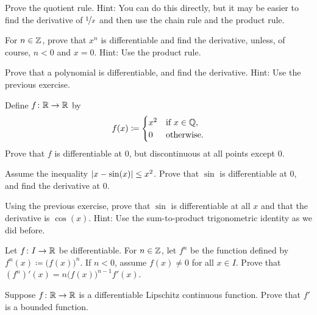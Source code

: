 \begin{exercise}
Prove the quotient rule.  Hint: You can do this directly, but it may be
easier to find the derivative of $\nicefrac{1}{x}$ and then use
the chain rule and the product rule.
\end{exercise}

\begin{exercise} \label{exercise:diffofxn}
For $n \in {\mathbb{Z}}$,
prove that $x^n$ is differentiable and find the derivative,
unless, of course, $n < 0$ and $x=0$.
Hint: Use the product rule.
\end{exercise}

\begin{exercise}
Prove that a polynomial is differentiable, and find the derivative.
Hint: Use the previous exercise.
\end{exercise}

\begin{exercise}
Define $f \colon {\mathbb{R}} \to {\mathbb{R}}$ by
\begin{equation*}
f(x) \coloneqq
\begin{cases}
x^2 & \text{if } x \in {\mathbb{Q}},\\
0 & \text{otherwise.}
\end{cases}
\end{equation*}
Prove that $f$ is differentiable at $0$, but discontinuous at all points
except $0$.
\end{exercise}

\begin{exercise}
Assume the inequality $\left\lvert {x-\sin(x)} \right\rvert \leq x^2$.  Prove that $\sin$ is
differentiable at $0$, and find the derivative at $0$.
\end{exercise}

\begin{exercise}
Using the previous exercise, prove that $\sin$ is differentiable at all $x$
and that the derivative is $\cos(x)$.  Hint: Use the sum-to-product
trigonometric identity as we did before.
\end{exercise}

\begin{exercise}
Let $f \colon I \to {\mathbb{R}}$ be differentiable.  For $n \in {\mathbb{Z}}$, let $f^n$
be the function defined by $f^n(x) \coloneqq {\bigl( f(x) \bigr)}^n$.  If
$n < 0$, assume $f(x) \not= 0$ for all $x \in I$.  Prove that
$(f^n)'(x) = n {\bigl(f(x) \bigr)}^{n-1} f'(x)$.
\end{exercise}

\begin{exercise}
Suppose $f \colon {\mathbb{R}} \to {\mathbb{R}}$ is a differentiable
Lipschitz continuous function.
Prove that $f'$ is a bounded function.
\end{exercise}

